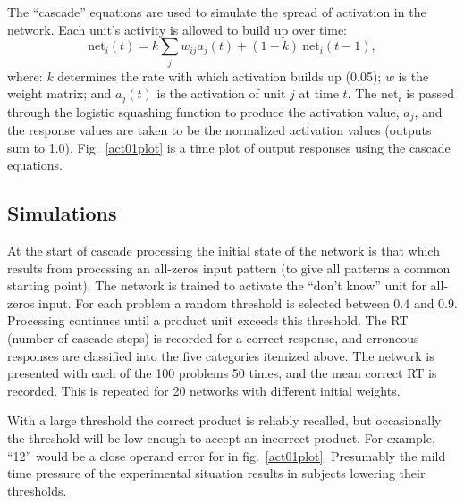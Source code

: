 The ``cascade'' equations \cite[p.~153]{pdp3} are used to simulate the
spread of activation in the network.  Each unit's activity is allowed to
build up over time:
\def\net{\mbox{net}}
\[ \net_i(t) = k \sum\limits_j w_{ij} a_j(t) + (1-k)\ \net_i(t-1),\]
\noindent where: $k$ determines the rate with
which activation builds up (0.05); $w$ is the weight matrix; and $a_j(t)$
is the activation of unit $j$ at time $t$. The $\net_i$ is passed through
the logistic squashing function to produce the activation value, $a_j$, and
the response values are taken to be the normalized activation values
(outputs sum to 1.0). Fig.~\ref{act01plot} is a time plot of output
responses using the cascade equations.

\subsection*{Simulations}

At the start of cascade processing the initial state of the network is that
which results from processing an all-zeros input pattern (to give all
patterns a common starting point). The network is trained to activate the
``don't know'' unit for all-zeros input. For each problem a random
threshold is selected between 0.4 and 0.9. Processing continues until a
product unit exceeds this threshold. The RT (number of cascade steps) is
recorded for a correct response, and erroneous responses are classified
into the five categories itemized above. The network is presented with each
of the 100 problems 50 times, and the mean correct RT is recorded.  This is
repeated for 20 networks with different initial weights.



With a large threshold the correct product is reliably recalled, but
occasionally the threshold will be low enough to accept an incorrect
product. For example, ``12'' would be a close operand error for  in
fig.~\ref{act01plot}. Presumably the mild time pressure of the experimental
situation results in subjects lowering their thresholds.


